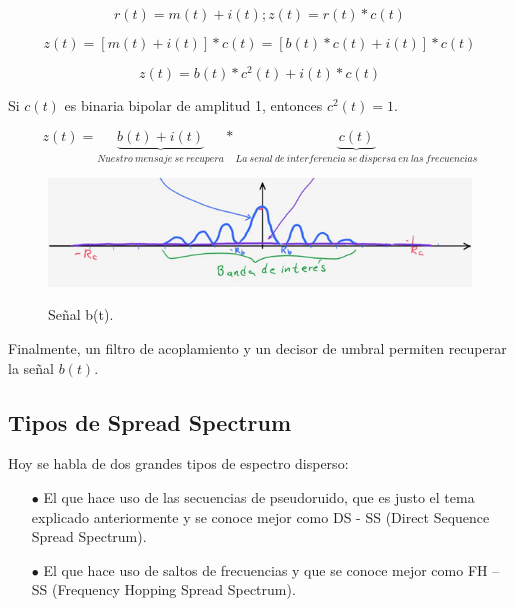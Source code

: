 \begin{equation} \label{capseis_dos}
r(t)= m(t)+ i(t);    z(t)= r(t)*c(t) 
\end{equation}

\begin{equation} \label{capseis_tres}
z(t)=[m(t)+ i(t)]*c(t)=  [b(t)*c(t)+i(t)]*c(t) 
\end{equation}

\begin{equation} \label{capseis-cuatro}
z(t)=b(t)*c^{2}(t)+i(t)*c(t)
\end{equation}

Si $c(t)$ es binaria bipolar de amplitud 1, entonces $c^{2}(t)=1$.

\begin{equation} \label{capseis-cinco}
z(t)=\underbrace{b(t)+i(t)}_{Nuestro \ mensaje \ se \ recupera   } * \underbrace{c(t)}_{ La \ senal\ de \ interferencia \ se \ dispersa \ en \ las \ frecuencias}
\end{equation}

\vspace{200px}
\begin{figure}[h!]
	\captionsetup{justification = raggedright, singlelinecheck = false}
	\caption{Señal b(t).} 
	\centering
	\includegraphics[scale=1]{Imagenes/Banda-seno.png}
	\label{fig:Banda-sena}
\end{figure}

Finalmente, un filtro de acoplamiento y un decisor de umbral permiten recuperar la señal $b(t)$.

\subsection{Tipos de Spread Spectrum}

Hoy se habla de dos grandes tipos de espectro disperso:

\begin{itemize}
	\item [$\bullet$] El que hace uso de las secuencias de pseudoruido, que es justo el tema explicado anteriormente y se conoce mejor como DS - SS (Direct Sequence Spread Spectrum).
	\item [$\bullet$] El que hace uso de saltos de frecuencias y que se conoce mejor como FH – SS (Frequency Hopping Spread Spectrum).
\end{itemize}

